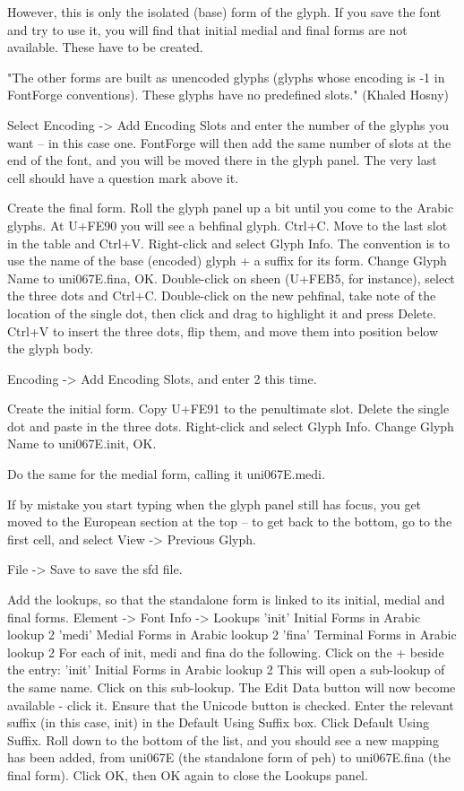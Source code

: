 However, this is only the isolated (base) form of the glyph.  If you save the font and try to use it, you will find that initial medial and final forms are not available.  These have to be created.

"The other forms are built as unencoded glyphs (glyphs whose encoding is -1 in FontForge conventions).  These glyphs have no predefined slots." (Khaled Hosny)

Select Encoding -> Add Encoding Slots and enter the number of the glyphs you want -- in this case one.  FontForge will then add the same number of slots at the end of the font, and you will be moved there in the glyph panel.  The very last cell should have a question mark above it.

Create the final form.
Roll the glyph panel up a bit until you come to the Arabic glyphs.
At U+FE90 you will see a behfinal glyph.
Ctrl+C.
Move to the last slot in the table and Ctrl+V.
Right-click and select Glyph Info.
The convention is to use the name of the base (encoded) glyph + a suffix for its form.
Change Glyph Name to uni067E.fina, OK.
Double-click on sheen (U+FEB5, for instance), select the three dots and Ctrl+C.
Double-click on the new pehfinal, take note of the location of the single dot, then click and drag to highlight it and press Delete.
Ctrl+V to insert the three dots, flip them, and move them into position below the glyph body.

Encoding -> Add Encoding Slots, and enter 2 this time.

Create the initial form.
Copy U+FE91 to the penultimate slot.
Delete the single dot and paste in the three dots.
Right-click and select Glyph Info.
Change Glyph Name to uni067E.init, OK.

Do the same for the medial form, calling it uni067E.medi.

If by mistake you start typing when the glyph panel still has focus, you get moved to the European section at the top -- to get back to the bottom, go to the first cell, and select View -> Previous Glyph.

File -> Save to save the sfd file.

Add the lookups, so that the standalone form is linked to its initial, medial and final forms.
Element -> Font Info -> Lookups
'init' Initial Forms in Arabic lookup 2
'medi' Medial Forms in Arabic lookup 2
'fina' Terminal Forms in Arabic lookup 2
For each of init, medi and fina do the following.
Click on the + beside the entry: 'init' Initial Forms in Arabic lookup 2
This will open a sub-lookup of the same name.
Click on this sub-lookup.
The Edit Data button will now become available - click it.
Ensure that the Unicode button is checked.
Enter the relevant suffix (in this case, init) in the Default Using Suffix box.
Click Default Using Suffix.
Roll down to the bottom of the list, and you should see a new mapping has been added, from uni067E (the standalone form of peh) to uni067E.fina (the final form).
Click OK, then OK again to close the Lookups panel.

